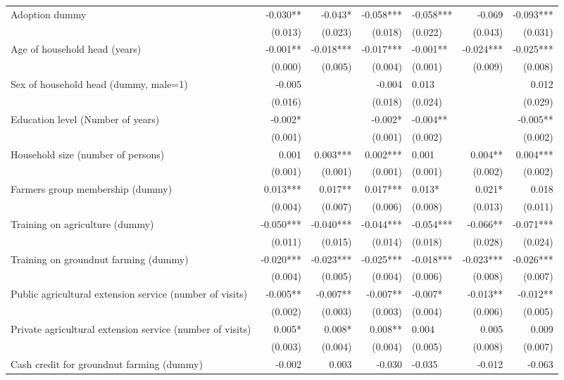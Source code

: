 \documentclass[
]{article}
\begin{document}
\begin{landscape}
\begin{longtable}[t]{lrrrlrr}
\endfoot
\bottomrule
\endlastfoot
Adoption dummy & -0.030** & -0.043* & -0.058*** & -0.058*** & -0.069 & -0.093***\\
 & (0.013) & (0.023) & (0.018) & (0.022) & (0.043) & (0.031)\\
Age of household head (years) & -0.001** & -0.018*** & -0.017*** & -0.001** & -0.024*** & -0.025***\\
 & (0.000) & (0.005) & (0.004) & (0.001) & (0.009) & (0.008)\\
Sex of household head (dummy, male=1) & -0.005 &  & -0.004 & 0.013 &  & 0.012\\
\addlinespace
 & (0.016) &  & (0.018) & (0.024) &  & (0.029)\\
Education level (Number of years) & -0.002* &  & -0.002* & -0.004** &  & -0.005**\\
 & (0.001) &  & (0.001) & (0.002) &  & (0.002)\\
Household size (number of persons) & 0.001 & 0.003*** & 0.002*** & 0.001 & 0.004** & 0.004***\\
 & (0.001) & (0.001) & (0.001) & (0.001) & (0.002) & (0.002)\\
\addlinespace
Farmers group membership (dummy) & 0.013*** & 0.017** & 0.017*** & 0.013* & 0.021* & 0.018\\
 & (0.004) & (0.007) & (0.006) & (0.008) & (0.013) & (0.011)\\
Training on agriculture (dummy) & -0.050*** & -0.040*** & -0.044*** & -0.054*** & -0.066** & -0.071***\\
 & (0.011) & (0.015) & (0.014) & (0.018) & (0.028) & (0.024)\\
Training on groundnut farming (dummy) & -0.020*** & -0.023*** & -0.025*** & -0.018*** & -0.023*** & -0.026***\\
\addlinespace
 & (0.004) & (0.005) & (0.004) & (0.006) & (0.008) & (0.007)\\
Public agricultural extension service (number of visits) & -0.005** & -0.007** & -0.007** & -0.007* & -0.013** & -0.012**\\
 & (0.002) & (0.003) & (0.003) & (0.004) & (0.006) & (0.005)\\
Private agricultural extension service (number of visits) & 0.005* & 0.008* & 0.008** & 0.004 & 0.005 & 0.009\\
 & (0.003) & (0.004) & (0.004) & (0.005) & (0.008) & (0.007)\\
\addlinespace
Cash credit for groundnut farming (dummy) & -0.002 & 0.003 & -0.030 & -0.035 & -0.012 & -0.063\\

\end{longtable}
\end{landscape}
\end{document}
